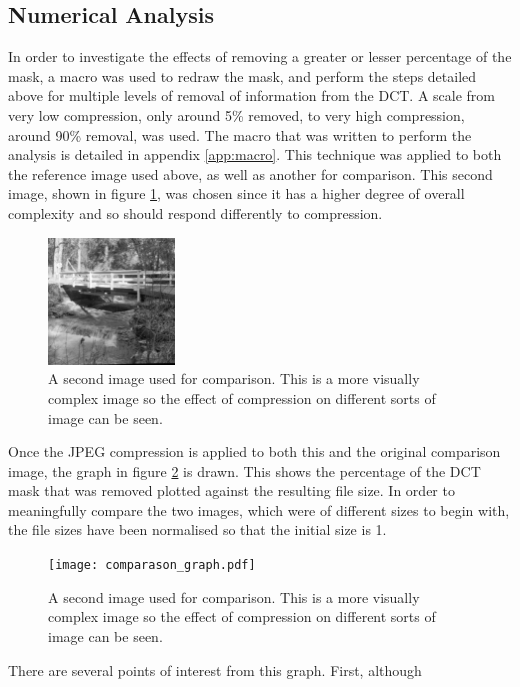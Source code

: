 \subsection{Numerical Analysis} %
\label{sub:numerical_analysis}
In order to investigate the effects of removing a greater or lesser percentage of the mask, a macro was used to redraw the mask, and perform the steps detailed above for multiple levels of removal of information from the DCT. A scale from very low compression, only around 5\% removed, to very high compression, around 90\% removal, was used. The macro that was written to perform the analysis is detailed in appendix \ref{app:macro}. This technique was applied to both the reference image used above, as well as another for comparison. This second image, shown in figure \ref{fig:bridge_original}, was chosen since it has a higher degree of overall complexity and so should respond differently to compression.
\begin{figure}[ht]
	\centering
	\includegraphics[width=0.3\textwidth]{bridge.png}
	\caption{A second image used for comparison. This is a more visually complex image so the effect of compression on different sorts of image can be seen.\label{fig:bridge_original}}
\end{figure}

Once the JPEG compression is applied to both this and the original comparison image, the graph in figure \ref{fig:comparason_graph} is drawn. This shows the percentage of the DCT mask that was removed plotted against the resulting file size. In order to meaningfully compare the two images, which were of different sizes to begin with, the file sizes have been normalised so that the initial size is 1.
\begin{figure}[ht]
	\centering
	\texttt{[image: comparason\_graph.pdf]}
	\caption{A second image used for comparison. This is a more visually complex image so the effect of compression on different sorts of image can be seen.\label{fig:comparason_graph}}
\end{figure}

There are several points of interest from this graph. First, although 




